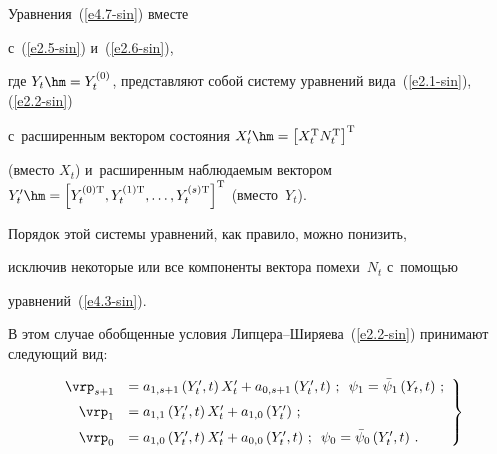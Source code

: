 Уравнения~(\ref{e4.7-sin}) вместе 


с~(\ref{e2.5-sin}) и~(\ref{e2.6-sin}),


где $Y_t\hm=Y_t^{(0)}$, представляют собой систему уравнений вида~(\ref{e2.1-sin}), (\ref{e2.2-sin}) 


с~расширенным вектором состояния  $X_t'\hm= 


\left[X_t^{\mathrm{T}} N_t^{\mathrm{T}}\right]^{\mathrm{T}}$


(вмес\-то $X_t$) и~расширенным наблюдаемым вектором  $Y_t' \hm=


\left[Y_t^{(0)\mathrm{T}}, Y_t^{(1)\mathrm{T}},\ldots ,


Y_t^{(s)\mathrm{T}}\right]^{\mathrm{T}}$ (вместо~$Y_t$).


Порядок этой системы уравнений, как правило, можно понизить,


исключив некоторые или все компоненты вектора помехи~$N_t$ с~по\-мощью


уравнений~(\ref{e4.3-sin}).





В этом случае обобщенные условия Лип\-це\-ра--Ши\-ря\-ева~(\ref{e2.2-sin}) принимают следующий вид:


\begin{equation}


\left.


\begin{array}{rl}


\vrp_{s+1} &= a_{1, s+1}\left(Y_t' , t\right) X_t' + 


a_{0,s+1} \left(Y_t', t\right)\,;\enskip \psi_1 = \bar \psi_1 \left(Y_t, t\right)\,;


\\[6pt]


\vrp_1 &= a_{1,1}\left(Y_t', t\right) X_t' + a_{1,0} \left(Y_t'\right)\,;\\[6pt]


\vrp_0 &= a_{1,0} \left(Y_t', t\right) X_t' + a_{0,0} \left(Y_t',t\right)\,;\enskip 


\psi_0 = \bar \psi_0 \left(Y_t', t\right)\,.


\end{array}


\right\}


\label{e4.9-sin}


\end{equation}





